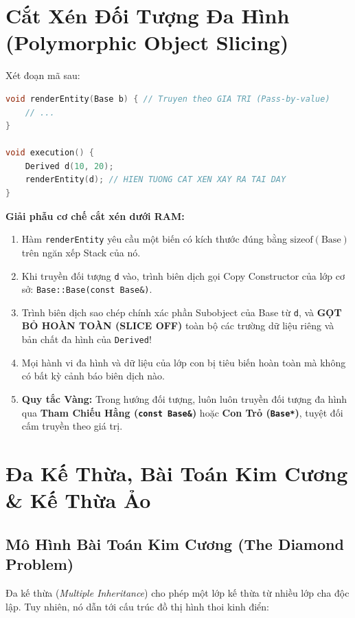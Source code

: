 \documentclass[12pt,a4paper,oneside]{book}
\begin{document}
\section{Cắt Xén Đối Tượng Đa Hình (Polymorphic Object Slicing)}

\begin{dangerbox}
Xét đoạn mã sau:
\begin{lstlisting}[language=C++]
void renderEntity(Base b) { // Truyen theo GIA TRI (Pass-by-value)
    // ...
}

void execution() {
    Derived d(10, 20);
    renderEntity(d); // HIEN TUONG CAT XEN XAY RA TAI DAY
}
\end{lstlisting}

\textbf{Giải phẫu cơ chế cắt xén dưới RAM:}
\begin{enumerate}
    \item Hàm \texttt{renderEntity} yêu cầu một biến có kích thước đúng bằng $\text{sizeof}(\text{Base})$ trên ngăn xếp Stack của nó.
    \item Khi truyền đối tượng \texttt{d} vào, trình biên dịch gọi Copy Constructor của lớp cơ sở: \texttt{Base::Base(const Base\&)}.
    \item Trình biên dịch sao chép chính xác phần Subobject của Base từ \texttt{d}, và \textbf{GỌT BỎ HOÀN TOÀN (SLICE OFF)} toàn bộ các trường dữ liệu riêng và bản chất đa hình của \texttt{Derived}!
    \item Mọi hành vi đa hình và dữ liệu của lớp con bị tiêu biến hoàn toàn mà không có bất kỳ cảnh báo biên dịch nào.
    \item \textbf{Quy tắc Vàng:} Trong hướng đối tượng, luôn luôn truyền đối tượng đa hình qua \textbf{Tham Chiếu Hằng (\texttt{const Base\&})} hoặc \textbf{Con Trỏ (\texttt{Base*})}, tuyệt đối cấm truyền theo giá trị.
\end{enumerate}
\end{dangerbox}

\section{Đa Kế Thừa, Bài Toán Kim Cương \& Kế Thừa Ảo}

\subsection{Mô Hình Bài Toán Kim Cương (The Diamond Problem)}

Đa kế thừa (\textit{Multiple Inheritance}) cho phép một lớp kế thừa từ nhiều lớp cha độc lập. Tuy nhiên, nó dẫn tới cấu trúc đồ thị hình thoi kinh điển:
\end{document}
